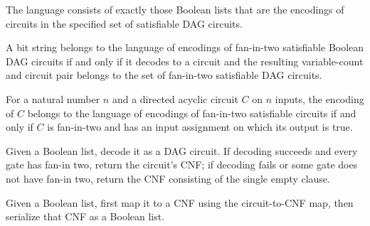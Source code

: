 \begin{definition}
\label{BoolCircuit.dagCktSatLang}
\leanok
{}
The language consists of exactly those Boolean lists that are the encodings of circuits
in the specified set of satisfiable DAG circuits.
\end{definition}

\begin{theorem}
\label{BoolCircuit.mem_dagCktSatLang_iff_decode}
\leanok
{}
A bit string belongs to the language of encodings of fan-in-two satisfiable Boolean DAG
circuits if and only if it decodes to a circuit and the resulting variable-count and
circuit pair belongs to the set of fan-in-two satisfiable DAG circuits.
\end{theorem}

\begin{theorem}
\label{BoolCircuit.encode_mem_dagCktSatLang_iff}
\leanok
{}
For a natural number $n$ and a directed acyclic circuit $C$ on $n$ inputs, the encoding
of $C$ belongs to the language of encodings of fan-in-two satisfiable circuits if and
only if $C$ is fan-in-two and has an input assignment on which its output is true.
\end{theorem}

\begin{definition}
\label{BoolCircuit.dagCktSatToCNF}
\leanok
{}
Given a Boolean list, decode it as a DAG circuit. If decoding succeeds and every gate
has fan-in two, return the circuit's CNF; if decoding fails or some gate does not have
fan-in two, return the CNF consisting of the single empty clause.
\end{definition}

\begin{definition}
\label{BoolCircuit.dagCktSatToSAT3}
\leanok
{}
Given a Boolean list, first map it to a CNF using the circuit-to-CNF map, then serialize
that CNF as a Boolean list.
\end{definition}

